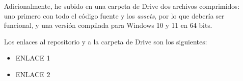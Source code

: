 \bigskip

Adicionalmente, he subido en una carpeta de Drive dos archivos comprimidos: uno primero con todo el código fuente y los \textit{assets}, por lo que debería ser funcional, y una versión compilada para Windows 10 y 11 en 64 bits.

\bigskip

Los enlaces al repositorio y a la carpeta de Drive son los siguientes:

\begin{itemize}
    \item ENLACE 1
    \item ENLACE 2
\end{itemize}